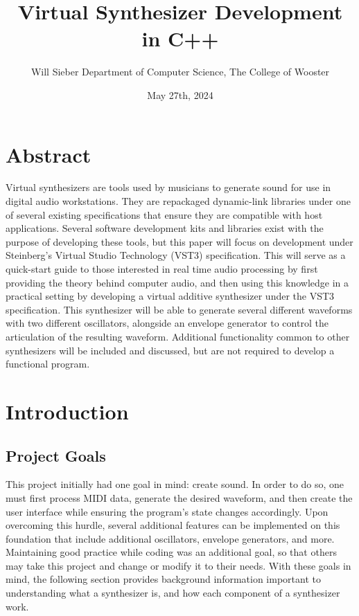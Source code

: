 \documentclass[12pt]{article}
\title{Virtual Synthesizer Development in C++}
\date{May 27th, 2024}
\author{\parbox{\linewidth}{\centering%
	Will Sieber
	\endgraf\bigskip
	Department of Computer Science, The College of Wooster
	\bigskip
}}
\begin{document}
\maketitle

\newpage
\tableofcontents
\newpage

\section{Abstract}
Virtual synthesizers are tools used by musicians to generate sound for use in digital audio workstations. They are repackaged dynamic-link libraries under one of several existing specifications that ensure they are compatible with host applications. Several software development kits and libraries exist with the purpose of developing these tools, but this paper will focus on development under Steinberg's Virtual Studio Technology (VST3) specification. This will serve as a quick-start guide to those interested in real time audio processing by first providing the theory behind computer audio, and then using this knowledge in a practical setting by developing a virtual additive synthesizer under the VST3 specification. This synthesizer will be able to generate several different waveforms with two different oscillators, alongside an envelope generator to control the articulation of the resulting waveform. Additional functionality common to other synthesizers will be included and discussed, but are not required to develop a functional program.
\newpage

\section{Introduction}

\subsection{Project Goals}
This project initially had one goal in mind: create sound. In order to do so, one must first process MIDI data, generate the desired waveform, and then create the user interface while ensuring the program's state changes accordingly. Upon overcoming this hurdle, several additional features can be implemented on this foundation that include additional oscillators, envelope generators, and more. Maintaining good practice while coding was an additional goal, so that others may take this project and change or modify it to their needs. With these goals in mind, the following section provides background information important to understanding what a synthesizer is, and how each component of a synthesizer work. 
\end{document}
